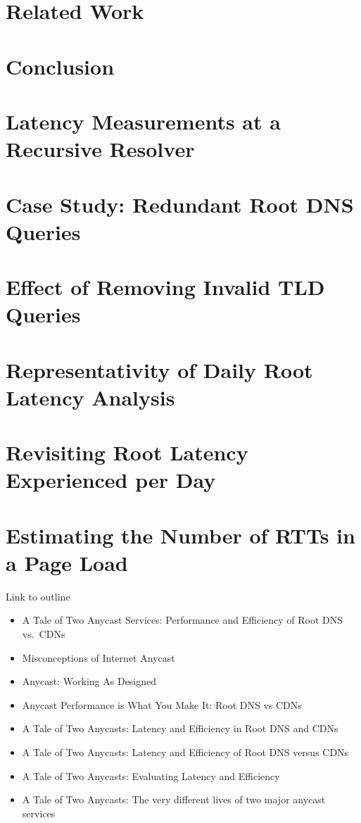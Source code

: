 \documentclass[sigconf,letterpaper,nonacm,10pt,anonymous]{acmart}
\begin{document}
\section{Related Work}\label{related-work}

\section{Conclusion}\label{conclusion}

\section{Latency Measurements at a Recursive
Resolver}\label{latency-measurements-at-a-recursive-resolver}

\section{Case Study: Redundant Root DNS
Queries}\label{case-study-redundant-root-dns-queries}

\section{Effect of Removing Invalid TLD
Queries}\label{effect-of-removing-invalid-tld-queries}

\section{Representativity of Daily Root Latency
Analysis}\label{representativity-of-daily-root-latency-analysis}

\section{Revisiting Root Latency Experienced per
Day}\label{revisiting-root-latency-experienced-per-day}

\section{Estimating the Number of RTTs in a Page
Load}\label{estimating-the-number-of-rtts-in-a-page-load}

Link to outline

\begin{itemize}
\item
  A Tale of Two Anycast Services: Performance and Efficiency of Root DNS
  vs.~CDNs
\item
  Misconceptions of Internet Anycast
\item
  Anycast: Working As Designed
\item
  Anycast Performance is What You Make It: Root DNS vs CDNs
\item
  A Tale of Two Anycasts: Latency and Efficiency in Root DNS and CDNs
\item
  A Tale of Two Anycasts: Latency and Efficiency of Root DNS versus CDNs
\item
  A Tale of Two Anycasts: Evaluating  Latency and
  Efficiency
\item
  A Tale of Two Anycasts: The very different lives of two major anycast
  services
\end{itemize}
\end{document}
